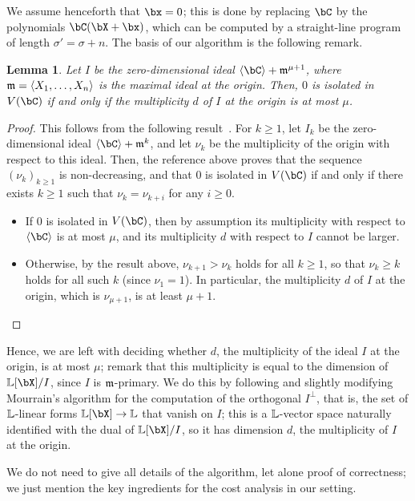 \documentclass[12pt]{article}
\newtheorem{lemma}[definition]{Lemma}
\begin{document}
We assume henceforth that $\bx=0$; this is done by replacing $\bC$ by
the polynomials $\bC(\bX+\bx)$, which can be computed by a
straight-line program of length $\sigma'=\sigma+n$.  The basis of our
algorithm is the following remark.

\begin{lemma}
  Let $I$ be the zero-dimensional ideal
  $\langle \bC \rangle + \m^{\mu+1}$, where
  $\mathfrak{m}=\langle X_1,\dots,X_n\rangle$ is the maximal ideal at the
  origin. Then, $0$ is isolated in $V(\bC)$ if and only if the
  multiplicity $d$ of $I$ at the origin is at most $\mu$.
\end{lemma}
\begin{proof}
  This follows from the following
  result~\cite[Theorem~A.1]{BaHaPeSo09}.  For $k \ge 1$, let $I_k$ be
  the zero-dimensional ideal $\langle \bC \rangle + \m^{k}$, and let
  $\nu_k$ be the multiplicity of the origin with respect to this
  ideal. Then, the reference above proves that the sequence
  $(\nu_k)_{k \ge 1}$ is non-decreasing, and that $0$ is isolated in
  $V(\bC)$ if and only if there exists $k\ge 1$ such that
  $\nu_k=\nu_{k+i}$ for any $i\geq 0$.
  \begin{itemize}
  \item If $0$ is isolated in $V(\bC)$, then by assumption 
    its multiplicity with respect to $\langle \bC\rangle$ is at most $\mu$,
    and its multiplicity $d$ with respect to $I$ cannot be larger.
  \item Otherwise, by the result above, $\nu_{k+1} > \nu_k$ holds for
    all $k \ge 1$, so that $\nu_k \ge k$ holds for all such $k$ (since
    $\nu_1=1$). In particular, the multiplicity $d$ of 
 $I$ at the origin, which is $\nu_{\mu+1}$, is at least $\mu+1$.
    \qedhere
  \end{itemize}
\end{proof}

Hence, we are left with deciding whether $d$, the multiplicity of the
ideal $I$ at the origin, is at most $\mu$; remark that this
multiplicity is equal to the dimension of $\LL[\bX]/I$, since $I$ is
$\mathfrak{m}$-primary.  We do this by following and slightly modifying
Mourrain's algorithm for the computation of the orthogonal
$I^{\perp}$, that is, the set of $\mathbb{L}$-linear forms $\LL[\bX] \to \LL$
that vanish on $I$; this is a $\mathbb{L}$-vector space naturally identified
with the dual of $\LL[\bX]/I$, so it has dimension $d$, the
multiplicity of $I$ at the origin.

We do not need to give all details of the algorithm, let alone proof
of correctness; we just mention the key ingredients for the cost
analysis in our setting. 
\end{document}
